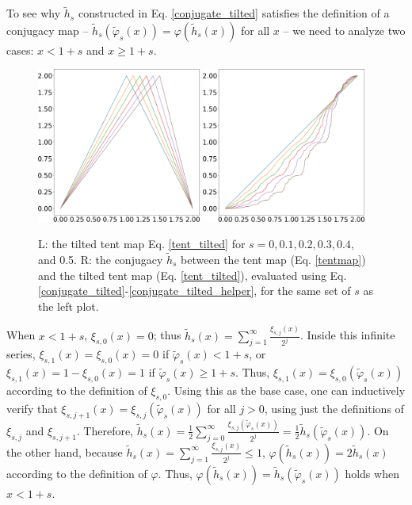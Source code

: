 To see why $\tilde{h}_s$ constructed in Eq. \ref{conjugate_tilted} satisfies the definition of a conjugacy map --
$\tilde{h}_s(\tilde\varphi_s(x)) = \varphi(\tilde{h}_s(x))$ for all $x$ --
we need to analyze two cases: $x<1+s$ and $x\ge 1+s$.
\begin{figure}
  \centering
    \includegraphics[width=0.48\textwidth]{tilted_tent_map.png}
    \hspace{0.02\textwidth}
    \includegraphics[width=0.48\textwidth]{tilted_conjugate_map.png}
    \\ \vspace{0.02\textwidth}
     \caption{L: the tilted tent map Eq. \ref{tent_tilted} for $s=0, 0.1, 0.2, 0.3, 0.4,$ and 0.5. R: the conjugacy $\tilde{h}_s$ between the tent map (Eq. \ref{tentmap})
    and the tilted tent map (Eq. \ref{tent_tilted}), evaluated using
    Eq. \ref{conjugate_tilted}-\ref{conjugate_tilted_helper}, for the same set of $s$ as the
    left plot.}
     \label{fig:tilted_tent_conjugate}
\end{figure}
When $x<1+s$, $\xi_{s,0}(x)=0$; thus
$\tilde{h}_s(x) = \sum_{j=1}^{\infty} \frac{\xi_{s,j}(x)}{2^j}$.
Inside this infinite series, $\xi_{s,1}(x)=\xi_{s,0}(x)=0$ if $\tilde\varphi_s(x)<1+s$,
or $\xi_{s,1}(x)=1-\xi_{s,0}(x)=1$ if $\tilde\varphi_s(x)\ge 1+s$.
Thus, $\xi_{s,1}(x) = \xi_{s,0}(\tilde{\varphi}_s(x))$ according to the definition of $\xi_{s,0}$.
Using this as the base case, one can inductively verify that
$\xi_{s,j+1}(x) = \xi_{s,j}(\tilde\varphi_s(x))$
for all $j>0$, using just the definitions of $\xi_{s,j}$ and $\xi_{s,j+1}$.
Therefore,
$\tilde{h}_s(x) = \frac12 \sum_{j=0}^{\infty} \frac{\xi_{s,j}(\tilde\varphi_s(x))}{2^j}
=\frac12 \tilde{h}_s(\tilde\varphi_s(x))$.
On the other hand, because
$\tilde{h}_s(x) = \sum_{j=1}^{\infty} \frac{\xi_{s,j}(x)}{2^j}\le1$,
$\varphi(\tilde{h}_s(x)) = 2\tilde{h}_s(x)$ according
to the definition of $\varphi$.  Thus,
$\varphi(\tilde{h}_s(x)) = \tilde{h}_s(\tilde\varphi_s(x))$ holds when $x<1+s$.

